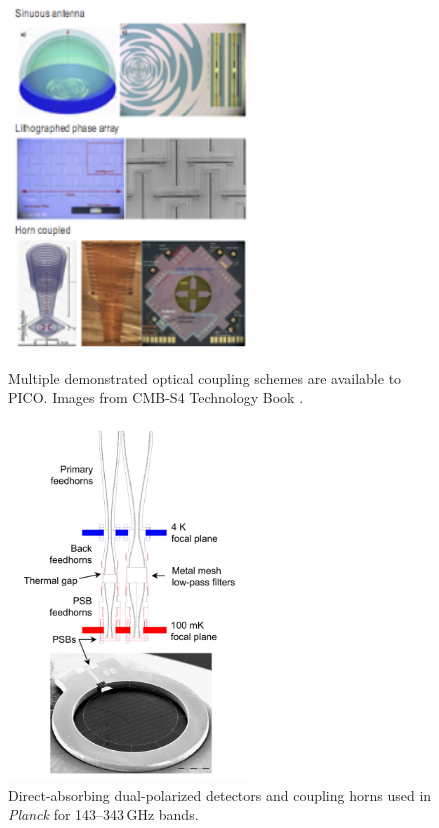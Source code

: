 \begin{figure}
  \begin{minipage}[b]{0.475\textwidth}
    \begin{center}
    \includegraphics[width=2.5in]{figures/OpticalCoupling.png}
    \caption{\captiontext 
      Multiple demonstrated optical coupling schemes are available   to PICO. Images from CMB-S4 Technology Book   \citep{Abitbol2017}.\label{fig:OpticalCoupling}}
   \end{center}
  \end{minipage}
  \hfill
  \begin{minipage}[b]{0.475\textwidth}
    \begin{center}
    \includegraphics[width=2.5in]{figures/DirectAbsorbing.png}
    \caption{\captiontext 
      Direct-absorbing dual-polarized detectors and coupling horns used in \textit{Planck} for 143--343\,GHz bands.\label{fig:DirectAbsorbing}}
    \end{center}
  \end{minipage}
\end{figure}


